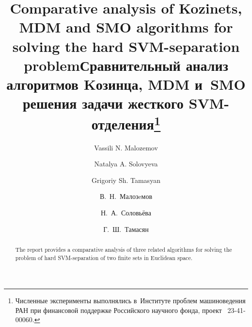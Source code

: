 \begin{englishtitle} %
\title{Comparative analysis of Kozinets, MDM and SMO algorithms for solving the hard SVM-separation problem}
\author{Vassili N. Malozemov \and Natalya A. Solovyeva  \and  Grigoriy Sh. Tamasyan
}

\maketitle

\begin{abstract}
The report provides a comparative analysis of three related algorithms for solving the problem of hard SVM-separation of two finite sets in Euclidean space.

\end{abstract}
\end{englishtitle}

\iffalse
\documentclass[12pt]{llncs}  


\usepackage{iftex}

\ifPDFTeX
\usepackage[T2A]{fontenc}
\usepackage[utf8]{inputenc} %
\usepackage[english,russian]{babel}
\fi

\usepackage{todonotes} 

\usepackage[russian]{nla}


\fi
%

\title{Сравнительный анализ алгоритмов Kозинца, MDM и~SMO решения задачи жесткого SVM-отделения\thanks{Численные эксперименты выполнялись в~Институте проблем машиноведения РАН при финансовой поддержке Российского научного фонда, проект \textnumero~23-41-00060.}}
\author{В.~Н.~Малозeмов  %
  \and  %
  Н.~А.~Соловьёва
  \and
  Г.~Ш.~Тамасян
} %

